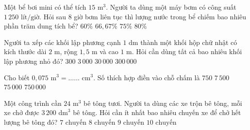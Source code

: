 \begin{ex} %
Một bể bơi mini có thể tích $15\text{ m}^3$. Người ta dùng một máy bơm có công suất $1\,250\text{ lít/giờ}$. Hỏi sau $8$ giờ bơm liên tục thì lượng nước trong bể chiếm bao nhiêu phần trăm dung tích bể?
\choice
{$60\%$}
{\True $66{,}67\%$}
{$75\%$}
{$80\%$}
\end{ex}

\begin{ex} %
Người ta xếp các khối lập phương cạnh $1\text{ dm}$ thành một khối hộp chữ nhật có kích thước dài $2\text{ m}$, rộng $1{,}5\text{ m}$ và cao $1\text{ m}$. Hỏi cần dùng tất cả bao nhiêu khối lập phương nhỏ đó?
\choice
{$300$}
{\True $3\,000$}
{$30\,000$}
{$300\,000$}
\end{ex}

\begin{ex} %
Cho biết $0{,}075\text{ m}^3 = \ldots\ldots\text{ cm}^3$. Số thích hợp điền vào chỗ chấm là
\choice
{$750$}
{$7\,500$}
{\True $75\,000$}
{$750\,000$}
\end{ex}

\begin{ex} %
Một công trình cần $24\text{ m}^3$ bê tông tươi. Người ta dùng các xe trộn bê tông, mỗi xe chở được $3\,200\text{ dm}^3$ bê tông. Hỏi cần ít nhất bao nhiêu chuyến xe để chở hết lượng bê tông đó?
\choice
{$7\text{ chuyến}$}
{\True $8\text{ chuyến}$}
{$9\text{ chuyến}$}
{$10\text{ chuyến}$}
\end{ex}

